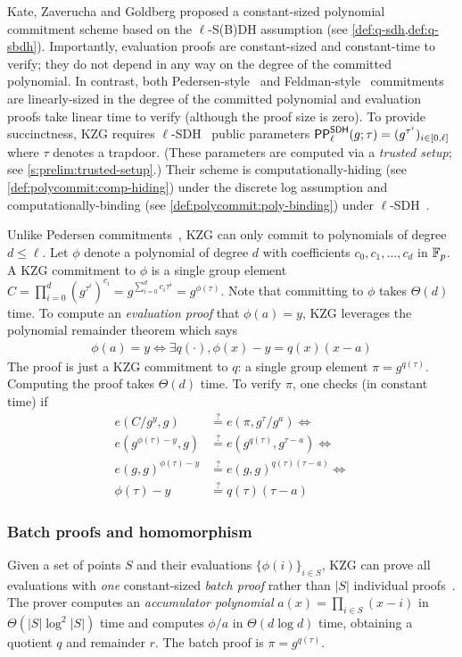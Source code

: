 Kate, Zaverucha and Goldberg proposed a constant-sized polynomial commitment scheme based on the $\ell$-S(B)DH assumption (see \cref{def:q-sdh,def:q-sbdh}).
Importantly, evaluation proofs are constant-sized and constant-time to verify; they do not depend in any way on the degree of the committed polynomial.
In contrast, both Pedersen-style~\cite{Pedersen1991NonInteractive} and Feldman-style~\cite{Feldman87} commitments are linearly-sized in the degree of the committed polynomial and evaluation proofs take linear time to verify (although the proof size is zero).
To provide succinctness, KZG requires $\ell$-SDH~\cite{BB08} public parameters $\mathsf{PP}^\mathsf{SDH}_\ell(g;\tau)=(g^{\tau^i})_{i\in[0,\ell]}$ where $\tau$ denotes a trapdoor.
(These parameters are computed via a \textit{trusted setup}; see \cref{s:prelim:trusted-setup}.)
Their scheme is computationally-hiding (see \cref{def:polycommit:comp-hiding}) under the discrete log assumption and computationally-binding (see \cref{def:polycommit:poly-binding}) under $\ell$-SDH~\cite{KZG10a}.

Unlike Pedersen commitments~\cite{Pedersen1991NonInteractive}, KZG can only commit to polynomials of degree $d\le \ell$.
Let $\phi$ denote a polynomial of degree $d$ with coefficients $c_0, c_1, \dots, c_d$ in $\mathbb{F}_p$.
A KZG commitment to $\phi$ is a single group element $C = \prod_{i=0}^d {\left(g^{\tau^i}\right)^{c_i}} = g^{\sum_{i=0}^d c_i \tau^i} = g^{\phi(\tau)}$.
Note that committing to $\phi$ takes $\Theta(d)$ time.
To compute an \textit{evaluation proof} that $\phi(a) = y$, KZG leverages the polynomial remainder theorem which says
\begin{align}
    \phi(a) = y \Leftrightarrow \exists q(\cdot), \phi(x) - y = q(x)(x-a)
    \label{eq:poly-rem-thm}
\end{align}
The proof is just a KZG commitment to $q$: a single group element $\pi=g^{q(\tau)}$.
Computing the proof takes $\Theta(d)$ time.
To verify $\pi$, one checks (in constant time) if 
\begin{align*}
e(C / g^y, g)            &\stackrel{?}{=} e(\pi, g^{\tau}/g^a) \Leftrightarrow\\
e(g^{\phi(\tau) - y}, g) &\stackrel{?}{=} e(g^{q(\tau)},g^{\tau-a})\Leftrightarrow\\
e(g,g)^{\phi(\tau)-y}    &\stackrel{?}{=} e(g,g)^{q(\tau)(\tau-a)} \Leftrightarrow\\
{\phi(\tau)-y}           &\stackrel{?}{=} q(\tau)(\tau-a)
\end{align*}

\subsubsection{Batch proofs and homomorphism}
\label{s:prelim:polycommit:kzg:batch}
\label{s:prelim:polycommit:kzg:homomorphism}
Given a set of points $S$ and their evaluations $\{\phi(i)\}_{i\in S}$, KZG can prove all evaluations with \textit{one} constant-sized \textit{batch proof} rather than $|S|$ individual proofs~\cite{KZG10a}.
The prover computes an \textit{accumulator polynomial} $a(x)=\prod_{i\in S} (x-i)$ in $\Theta(|S|\log^2{|S|})$ time and computes $\phi/a$ in $\Theta(d\log{d})$ time, obtaining a quotient $q$ and remainder $r$.
The batch proof is $\pi=g^{q(\tau)}$.

